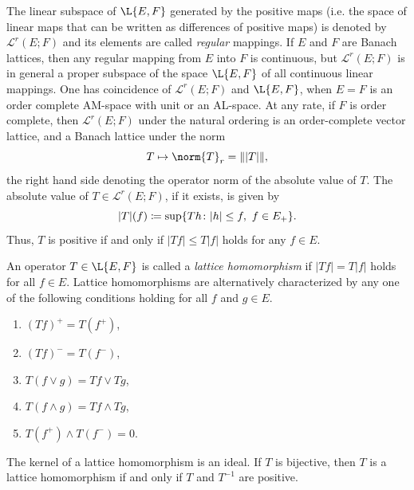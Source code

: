 The linear subspace of\/ $ \L{E,F} $ generated by the positive maps (i.e. the space of linear maps that can be written as differences of positive maps) is denoted by $ \mathcal{L}^{r}(E;F) $ and its elements are called \emph{regular} mappings.
If\/ $ E $ and $ F $ are Banach lattices, then any regular mapping from $ E $ into $ F $ is continuous, but  $ \mathcal{L}^{r}(E;F) $ is in general a proper subspace of the space $ \L{E,F} $ of all continuous linear mappings.
One has coincidence of\/ $ \mathcal{L}^{r}(E;F) $ and $ \L{E,F} $, \eg when $ E = F $ is an order complete AM-space with unit or an AL-space.
At any rate, if\/ $ F $ is order complete, then $ \mathcal{L}^{r}(E;F) $ under the natural ordering is an order-complete vector lattice, and a Banach lattice under the norm
\[
	T \mapsto \norm{T}_{r} = \| |T| \|,
\]
the right hand side denoting the operator norm of the absolute value of\/ $ T $.
The absolute value of\/ $ T \in  \mathcal{L}^{r}(E;F) $, if it exists, is given by
\[
	|T|(f) \coloneqq \sup\{ Th \colon |h| \leq f , \text{ $ f \in E_{+} $} \} . 
\]
Thus, $ T $ is positive if and only if\/ $ |Tf| \leq T|f| $ holds for any $ f \in E $.

An operator $ T \in \L{E,F} $ is called a \emph{lattice homomorphism} if\/ $ |Tf| = T|f| $ holds for all $ f \in E $.
Lattice homomorphisms are alternatively characterized by any one of the following conditions holding for all $ f $ and $ g \in E $.
\begin{enumerate}[\upshape (i)]

    \item 
    $(Tf)^{+} = T(f^{+})$,
    
    \item 
    $(Tf)^{-} = T(f^{-})$,
    
    \item 
    $T(f\vee g) = Tf\vee Tg$,
    
    \item 
    $T(f\wedge g) = Tf\wedge Tg$,
    
    \item 
    $T(f^{+})\wedge T(f^{-}) = 0$.

\end{enumerate}
The kernel of a lattice homomorphism is an ideal.
If\/ $ T $ is bijective, then $ T $ is a lattice homomorphism if and only if\/ $ T $ and $ T^{-1} $ are positive.
